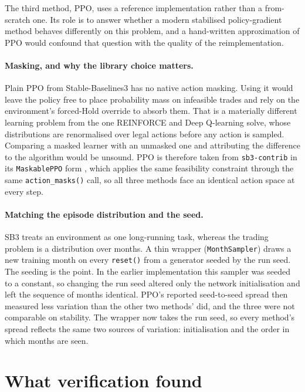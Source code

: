The third method, PPO, uses a reference implementation rather than a
from-scratch one. Its role is to answer whether a modern stabilised
policy-gradient method behaves differently on this problem, and a
hand-written approximation of PPO would confound that question with the
quality of the reimplementation.

\paragraph{Masking, and why the library choice matters.} Plain PPO from
Stable-Baselines3 \cite{raffin2021sb3} has no native action masking. Using
it would leave the policy free to place probability mass on infeasible
trades and rely on the environment's forced-Hold override to absorb them.
That is a materially different learning problem from the one REINFORCE and
Deep Q-learning solve, whose distributions are renormalised over legal
actions before any action is sampled. Comparing a masked learner with an
unmasked one and attributing the difference to the algorithm would be
unsound. PPO is therefore taken from \texttt{sb3-contrib} in its
\texttt{MaskablePPO} form \cite{raffin2021sb3}, which applies the same
feasibility constraint through the same \texttt{action\_masks()} call, so
all three methods face an identical action space at every step.

\paragraph{Matching the episode distribution and the seed.} SB3 treats an
environment as one long-running task, whereas the trading problem is a
distribution over months. A thin wrapper (\texttt{MonthSampler}) draws a
new training month on every \texttt{reset()} from a generator seeded by the
run seed. The seeding is the point. In the earlier implementation this
sampler was seeded to a constant, so changing the run seed altered only the
network initialisation and left the sequence of months identical. PPO's
reported seed-to-seed spread then measured less variation than the other two
methods' did, and the three were not comparable on stability. The wrapper
now takes the run seed, so every method's spread reflects the same two
sources of variation: initialisation and the order in which months are seen.

\section{What verification found}
\label{sec:defects}

